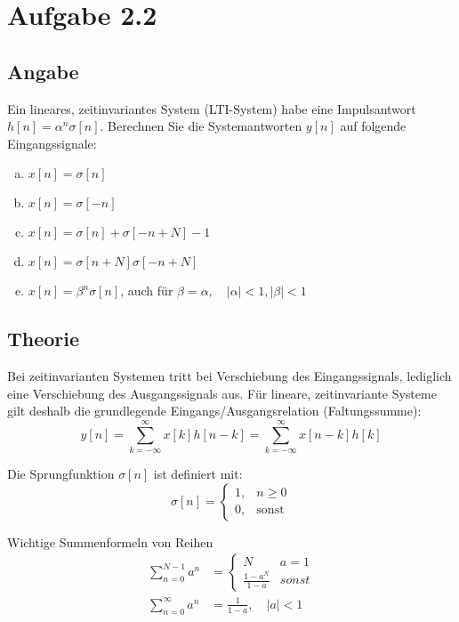 \section*{Aufgabe 2.2}
\subsection*{Angabe}
	Ein lineares, zeitinvariantes System (LTI-System) habe eine Impulsantwort $h[n]=\alpha ^n \sigma [n]$. Berechnen Sie die Systemantworten $y[n]$ auf folgende Eingangssignale:
	\begin{enumerate}[a)]
		\item $x[n]=\sigma [n]$
		\item $x[n]=\sigma [-n]$
		\item $x[n]=\sigma [n]+\sigma [-n+N]-1$
		\item $x[n]=\sigma [n+N]\sigma [-n+N]$
		\item $x[n]=\beta ^n \sigma [n]$, auch für $\beta = \alpha, \quad |\alpha|<1, |\beta| < 1$
	\end{enumerate}
\subsection*{Theorie}
	\begin{hint}
		Bei zeitinvarianten Systemen tritt bei Verschiebung des Eingangssignals, lediglich eine Verschiebung des Ausgangssignals aus. Für lineare, zeitinvariante Systeme gilt deshalb die grundlegende Eingangs/Ausgangsrelation (Faltungssumme):
		\[
			y[n] = \sum_{k=-\infty}^{\infty}x[k]h[n-k]=\sum_{k=-\infty}^{\infty}x[n-k]h[k]
		\]
	\end{hint}
	\begin{hint}
		Die Sprungfunktion $\sigma [n]$ ist definiert mit:
		\[
			\sigma [n] = \left\{ 
							\begin{array}{ll} 
								1, & n \ge 0 \\ 
								0, & \mbox{sonst} 
							\end{array}  
						 \right.
		\]
	\end{hint}
	\begin{hint}
		Wichtige Summenformeln von Reihen
		\begin{align*}
			\sum_{n=0}^{N-1}a^n &= \left\{ \begin{array}{ll} N & a=1\\ \frac{1-a^N}{1-a} & sonst \end{array} \right.\\
			\sum_{n=0}^{\infty}a^n &= \frac{1}{1-a},  \quad |a|<1
		\end{align*}
	\end{hint}
